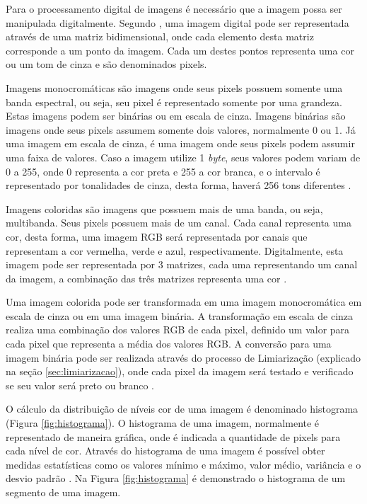 \documentclass[
	12pt,				%
	oneside,			%
	a4paper,			%
	english,			%
	french,				%
	spanish,			%
	brazil,				%
	]{abntex2}
\begin{document}
Para o processamento digital de imagens é necessário que a imagem possa ser manipulada digitalmente. Segundo \citet{pedriniSchwartz:2008}, uma imagem digital pode ser representada através de uma matriz bidimensional, onde cada elemento desta matriz corresponde a um ponto da imagem. Cada um destes pontos representa uma cor ou um tom de cinza e são denominados pixels. 

Imagens monocromáticas são imagens onde seus pixels possuem somente uma banda espectral, ou seja, seu pixel é representado somente por uma grandeza. Estas imagens podem ser binárias ou em escala de cinza. Imagens binárias são imagens onde seus pixels assumem somente dois valores, normalmente 0 ou 1. Já uma imagem em escala de cinza, é uma imagem onde seus pixels podem assumir uma faixa de valores. Caso a imagem utilize 1 \textit{byte}, seus valores podem variam de 0 a 255, onde 0 representa a cor preta e 255 a cor branca, e o intervalo é representado por tonalidades de cinza, desta forma, haverá 256 tons diferentes \cite{conciAzevedoLeta:2008}.

Imagens coloridas são imagens que possuem mais de uma banda, ou seja, multibanda. Seus pixels possuem mais de um canal. Cada canal representa uma cor, desta forma, uma imagem RGB será representada por canais que representam a cor vermelha, verde e azul, respectivamente. Digitalmente, esta imagem pode ser representada por 3 matrizes, cada uma representando um canal da imagem, a combinação das três matrizes representa uma cor \cite{conciAzevedoLeta:2008}.

Uma imagem colorida pode ser transformada em uma imagem monocromática em escala de cinza ou em uma imagem binária. A transformação em escala de cinza realiza uma combinação dos valores RGB de cada pixel, definido um valor para cada pixel que representa a média dos valores RGB. A conversão para uma imagem binária pode ser realizada através do processo de Limiarização (explicado na seção \ref{sec:limiarizacao}), onde cada pixel da imagem será testado e verificado se seu valor será preto ou branco \cite{mossmann2010extraccao}.

O cálculo da distribuição de níveis cor de uma imagem é denominado histograma (Figura \ref{fig:histograma}). O histograma de uma imagem, normalmente é representado de maneira gráfica, onde é indicada a quantidade de pixels para cada nível de cor. Através do histograma de uma imagem é possível obter medidas estatísticas como os valores mínimo e máximo, valor médio, variância e o desvio padrão \cite{gonzalesWoods:2008}. Na Figura \ref{fig:histograma} é demonstrado o histograma de um segmento de uma imagem. 
\end{document}
